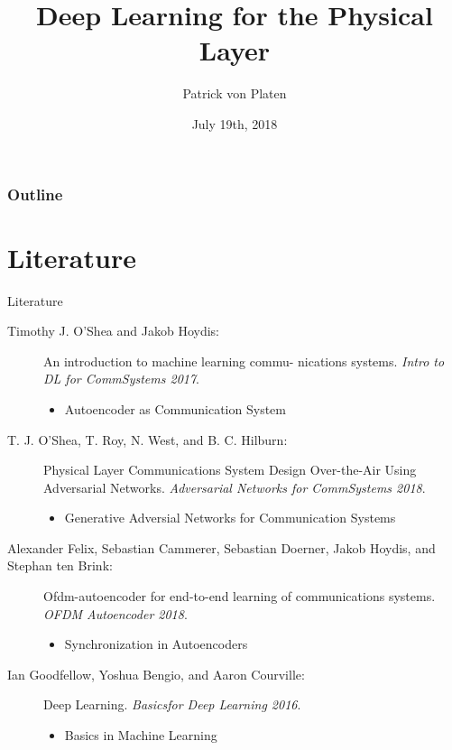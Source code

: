 \documentclass[xcolor=table,mathserif,9pt]{beamer}    %
\title[Seminar]{Deep Learning for the Physical Layer}
\author[Patrick von Platen]{Patrick von Platen}
\institute[RWTH Aachen University] %
{
  \strut Institute for Theoretical Information Technology\\
  \strut Univ.-Prof. Dr. rer. nat. Rudolf Mathar%
}
\date[19/7/2018]{July 19th, 2018}
\begin{document}
\begin{frame}[label=titlepage]
  \titlepage
\end{frame}

\begin{frame}
	\frametitle{Outline}
	\tableofcontents
\end{frame}



\section{Literature}%
\label{sec:literature}


\begin{frame}{Literature}
\begin{description}
\item [Timothy J. O'Shea and Jakob Hoydis:] An introduction to machine learning commu- nications systems. {\em Intro to DL for CommSystems 2017}.
  \begin{itemize}
  \item Autoencoder as Communication System 
  \end{itemize}
\end{description}
\begin{description}
\item [T. J. O'Shea, T. Roy, N. West, and B. C. Hilburn:] Physical Layer Communications System Design Over-the-Air Using Adversarial Networks. {\em Adversarial Networks for CommSystems 2018}.
  \begin{itemize}
  \item Generative Adversial Networks for Communication Systems 
  \end{itemize}
\end{description}
\begin{description}
\item [Alexander Felix, Sebastian Cammerer, Sebastian Doerner, Jakob Hoydis, and Stephan ten Brink:] Ofdm-autoencoder for end-to-end learning of communications systems. {\em OFDM Autoencoder 2018}.
  \begin{itemize}
  \item Synchronization in Autoencoders 
  \end{itemize}
\end{description}
\begin{description}
\item [Ian Goodfellow, Yoshua Bengio, and Aaron Courville:] Deep Learning. {\em Basicsfor Deep Learning 2016}.
  \begin{itemize}
  \item Basics in Machine Learning 
  \end{itemize}
\end{description}
\end{frame}
\end{document}
